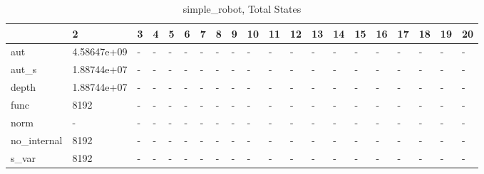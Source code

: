\begin{table}
\caption{simple_robot, Total States}
\label{simple_robot_total}
\begin{tabular}{llllllllllllllllllll}
\toprule
 & 2 & 3 & 4 & 5 & 6 & 7 & 8 & 9 & 10 & 11 & 12 & 13 & 14 & 15 & 16 & 17 & 18 & 19 & 20 \\
\midrule
aut & 4.58647e+09 & - & - & - & - & - & - & - & - & - & - & - & - & - & - & - & - & - & - \\
aut_s & 1.88744e+07 & - & - & - & - & - & - & - & - & - & - & - & - & - & - & - & - & - & - \\
depth & 1.88744e+07 & - & - & - & - & - & - & - & - & - & - & - & - & - & - & - & - & - & - \\
func & 8192 & - & - & - & - & - & - & - & - & - & - & - & - & - & - & - & - & - & - \\
norm & - & - & - & - & - & - & - & - & - & - & - & - & - & - & - & - & - & - & - \\
no_internal & 8192 & - & - & - & - & - & - & - & - & - & - & - & - & - & - & - & - & - & - \\
s_var & 8192 & - & - & - & - & - & - & - & - & - & - & - & - & - & - & - & - & - & - \\
\bottomrule
\end{tabular}
\end{table}
